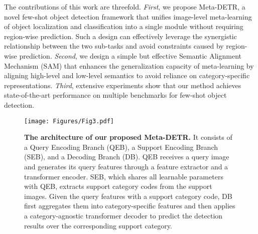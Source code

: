 \documentclass[10pt,twocolumn,letterpaper]{article}
\begin{document}
The contributions of this work are threefold.
\textit{First}, we propose Meta-DETR, a novel few-shot object detection framework that unifies image-level meta-learning of object localization and classification into a single module without requiring region-wise prediction. Such a design can effectively leverage the synergistic relationship between the two sub-tasks and avoid constraints caused by region-wise prediction.
\textit{Second}, we design a simple but effective Semantic Alignment Mechanism (SAM) that enhances the generalization capacity of meta-learning by aligning high-level and low-level semantics to avoid reliance on category-specific representations.
\textit{Third}, extensive experiments show that our method achieves state-of-the-art performance on multiple benchmarks for few-shot object detection.




\begin{figure*}[t!] 
\begin{center}
   \texttt{[image: Figures/Fig3.pdf]}
\end{center}
\vspace*{-1.0mm}
   \caption{\textbf{The architecture of our proposed Meta-DETR.} It consists of a Query Encoding Branch (QEB), a Support Encoding Branch (SEB), and a Decoding Branch (DB). QEB receives a query image and generates its query features through a feature extractor and a transformer encoder. SEB, which shares all learnable parameters with QEB, extracts support category codes from the support images. Given the query features with a support category code, DB first aggregates them into category-specific features and then applies a category-agnostic transformer decoder to predict the detection results over the corresponding support category.}
\label{fig:fig3_architecture}
\vspace*{+0.5mm}
\end{figure*}
\end{document}
